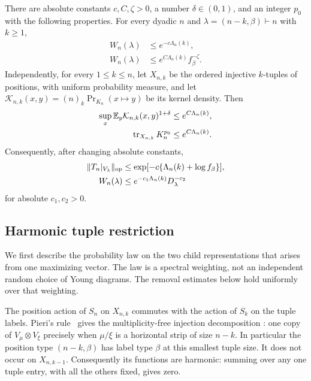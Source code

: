 \begin{theorem}\label{rec:main-harmonic-cycle}
There are absolute constants $c,C,\zeta>0$, a number $\delta\in(0,1)$,
and an integer $p_0$ with the following properties.  For every dyadic $n$
and $\lambda=(n-k,\beta)\vdash n$ with $k\ge1$,
\begin{align}
 W_n(\lambda)&\le e^{-c\Lambda_n(k)},\label{rec:level-contraction}\\
 W_n(\lambda)&\le e^{C\Lambda_n(k)}f_\beta^{-\zeta}.
 \label{rec:tail-contraction}
\end{align}
Independently, for every $1\le k\le n$, let $X_{n,k}$ be the ordered injective $k$-tuples of positions, with
uniform probability measure, and let
$\mathcal K_{n,k}(x,y)=(n)_k\Pr_{K_n}(x\mapsto y)$ be its kernel density.
Then
\begin{align}
 \sup_x\mathbb E_y\mathcal K_{n,k}(x,y)^{1+\delta}
   &\le e^{C\Lambda_n(k)},\label{rec:tuple-moment}\\
 \operatorname{tr}_{X_{n,k}}K_n^{p_0}
   &\le e^{C\Lambda_n(k)}.\label{rec:tuple-flat-trace}
\end{align}
Consequently, after changing absolute constants,
\begin{align}
 \|T_n|_{V_\lambda}\|_{\mathrm{op}}
   &\le \exp[-c\{\Lambda_n(k)+\log f_\beta\}],
       \label{rec:combined-tail-norm}\\
 W_n(\lambda)&\le e^{-c_1\Lambda_n(k)}D_\lambda^{-c_2}
       \label{rec:combined-dimension-norm}
\end{align}
for absolute $c_1,c_2>0$.
\end{theorem}

\subsection{Harmonic tuple restriction}
We first describe the probability law on the two child representations
that arises from one maximizing vector.  The law is a spectral weighting,
not an independent random choice of Young diagrams.  The removal estimates
below hold uniformly over that weighting.

The position action of $S_n$ on $X_{n,k}$ commutes with the action of
$S_k$ on the tuple labels.  Pieri's rule~\cite{Sagan2001,Stanley1999}
gives the multiplicity-free injection decomposition
\cite[Section 3.2, equation (3.1)]{DukesIhringerLindzey2020}: one copy of
$V_\mu\otimes V_\xi$ precisely when $\mu/\xi$ is a horizontal strip
of size $n-k$.  In particular the position type $(n-k,\beta)$ has
label type $\beta$ at this smallest tuple size.  It does not occur on
$X_{n,k-1}$.  Consequently its functions are harmonic: summing over any
one tuple entry, with all the others fixed, gives zero.

